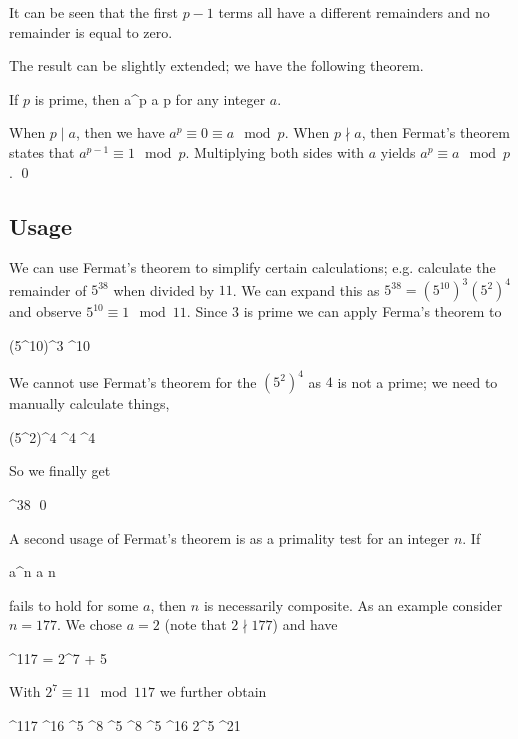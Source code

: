 \vspace{3mm}

It can be seen that the first $p-1$ terms all have a different remainders and no remainder is equal to zero.


The result can be slightly extended; we have the following theorem.

\begin{theorem}
    If $p$ is prime, then 
    \bee
    a^p \equiv a \mod p
    \eee
    for any integer $a$.
\end{theorem}

When $p \mid a$, then we have $a^p \equiv 0 \equiv a \mod p$. When $p \nmid a$, then Fermat's theorem states that $a^{p-1} \equiv 1 \mod p$. Multiplying both sides with $a$ yields $a^p \equiv a \mod p$. \qed

\subsection{Usage}

We can use Fermat's theorem to simplify certain calculations; e.g. calculate the remainder of $5^{38}$ when divided by $11$. We can expand this as $5^{38} = (5^{10})^3 (5^2)^4$ and observe $5^{10} \equiv 1 \mod 11$. Since $3$ is prime we can apply Ferma's theorem to

\bee
(5^{10})^3 ^{10}  
\eee

We cannot use Fermat's theorem for the $(5^2)^4$ as $4$ is not a prime; we need to manually calculate things,

\bee
(5^2)^4 ^4 ^4   
\eee

So we finally get

^{38}     \qed
\eee

A second usage of Fermat's theorem is as a primality test for an integer $n$. If

\bee
a^n \equiv a \mod n
\eee

fails to hold for some $a$, then $n$ is necessarily composite. As an example consider $n = 177$. We chose $a = 2$ (note that $2 \nmid 177$)  and have

^{117} = 2^{7  + 5}
\eee

With $2^7 \equiv 11 \mod 117$ we further obtain

^{117} ^{16} ^5 ^8 ^5 ^8 ^5 ^{16} 2^5 ^{21} 
\eee

